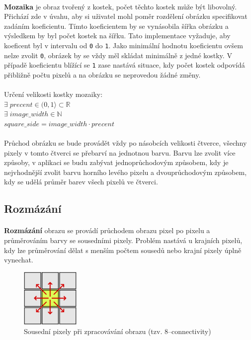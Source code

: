 \documentclass[12pt]{scrartcl}
\begin{document}
\paragraph{}
\textbf{Mozaika} je obraz tvořený z kostek, počet těchto kostek může být libovolný. Přichází zde v úvahu, aby si uživatel mohl poměr rozdělení obrázku specifikovat zadáním koeficientu. Tímto koeficientem by se vynásobila šířka obrázku a výsledkem by byl počet kostek na šířku. Tato implementace vyžaduje, aby koeficent byl v intervalu od \texttt{0} do \texttt{1}. Jako minimální hodnotu koeficientu ovšem nelze zvolit \texttt{0}, obrázek by se vždy měl skládat minimálně z jedné kostky. V případě koeficientu blížící se \texttt{1} zase nastává situace, kdy počet kostek odpovídá přibližně počtu pixelů a na obrázku se neprovedou žádné změny. \\\\
Určení velikosti kostky mozaiky:\\
$\exists \; precent \in (0,1 \rangle \subset{\mathbb{R}} $\\
$\exists \; image\_width \in \mathbb{N} $\\
$ square\_side = image\_width \cdot precent $

\paragraph{}
Průchod obrázku se bude provádět vždy po násobcích velikosti čtverce, všechny pixely v tomto čtverci se přebarví na jednotnou barvu. Barvu lze zvolit více způsoby, v aplikaci se budu zabývat jednoprůchodovým způsobem, kdy je nejvhodnější zvolit barvu horního levého pixelu a dvouprůchodovým způsobem, kdy se udělá průměr barev všech pixelů ve čtverci.

\subsection{Rozmázání}
\paragraph{}
\textbf{Rozmázání} obrazu se provádí průchodem obrazu pixel po pixelu a průměrováním barvy se sousedními pixely. Problém nastává u krajních pixelů, kdy lze průměrování dělat s menším počtem sousedů nebo krajní pixely úplně vynechat.

\begin{figure}[!ht]
	\centering
	\label{obr:connectivity}
	\includegraphics[width=0.25\textwidth,natwidth=1,natheight=1]{8-connectivity.pdf}
	\caption{Sousední pixely při zpracovávání obrazu (tzv. 8–connectivity)}
\end{figure}	
\end{document}

